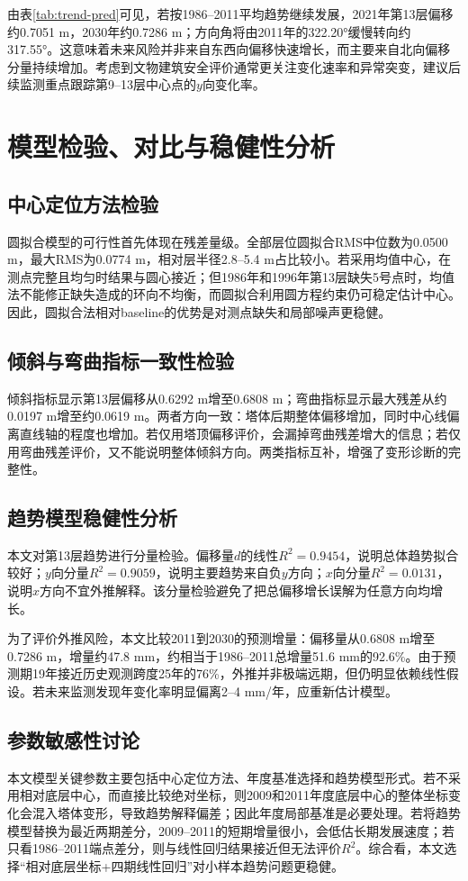 \documentclass[UTF8,a4paper,12pt]{ctexart}
\begin{document}
由表\ref{tab:trend-pred}可见，若按1986--2011平均趋势继续发展，2021年第13层偏移约0.7051 m，2030年约0.7286 m；方向角将由2011年的322.20°缓慢转向约317.55°。这意味着未来风险并非来自东西向偏移快速增长，而主要来自北向偏移分量持续增加。考虑到文物建筑安全评价通常更关注变化速率和异常突变，建议后续监测重点跟踪第9--13层中心点的$y$向变化率。

\section{模型检验、对比与稳健性分析}
\subsection{中心定位方法检验}
圆拟合模型的可行性首先体现在残差量级。全部层位圆拟合RMS中位数为0.0500 m，最大RMS为0.0774 m，相对层半径2.8--5.4 m占比较小。若采用均值中心，在测点完整且均匀时结果与圆心接近；但1986年和1996年第13层缺失5号点时，均值法不能修正缺失造成的环向不均衡，而圆拟合利用圆方程约束仍可稳定估计中心。因此，圆拟合法相对baseline的优势是对测点缺失和局部噪声更稳健。

\subsection{倾斜与弯曲指标一致性检验}
倾斜指标显示第13层偏移从0.6292 m增至0.6808 m；弯曲指标显示最大残差从约0.0197 m增至约0.0619 m。两者方向一致：塔体后期整体偏移增加，同时中心线偏离直线轴的程度也增加。若仅用塔顶偏移评价，会漏掉弯曲残差增大的信息；若仅用弯曲残差评价，又不能说明整体倾斜方向。两类指标互补，增强了变形诊断的完整性。

\subsection{趋势模型稳健性分析}
本文对第13层趋势进行分量检验。偏移量$d$的线性$R^2=0.9454$，说明总体趋势拟合较好；$y$向分量$R^2=0.9059$，说明主要趋势来自负$y$方向；$x$向分量$R^2=0.0131$，说明$x$方向不宜外推解释。该分量检验避免了把总偏移增长误解为任意方向均增长。

为了评价外推风险，本文比较2011到2030的预测增量：偏移量从0.6808 m增至0.7286 m，增量约47.8 mm，约相当于1986--2011总增量51.6 mm的92.6\%。由于预测期19年接近历史观测跨度25年的76\%，外推并非极端远期，但仍明显依赖线性假设。若未来监测发现年变化率明显偏离2--4 mm/年，应重新估计模型。

\subsection{参数敏感性讨论}
本文模型关键参数主要包括中心定位方法、年度基准选择和趋势模型形式。若不采用相对底层中心，而直接比较绝对坐标，则2009和2011年度底层中心的整体坐标变化会混入塔体变形，导致趋势解释偏差；因此年度局部基准是必要处理。若将趋势模型替换为最近两期差分，2009--2011的短期增量很小，会低估长期发展速度；若只看1986--2011端点差分，则与线性回归结果接近但无法评价$R^2$。综合看，本文选择“相对底层坐标+四期线性回归”对小样本趋势问题更稳健。
\end{document}
